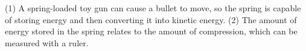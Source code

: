 (1) A spring-loaded toy gun can cause a bullet to move, so the spring is
capable of storing energy and then converting it into kinetic energy.
(2) The amount of energy stored in the spring relates to the amount of
compression, which can be measured with a ruler.



